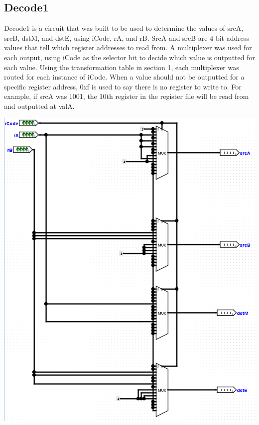 \documentclass{article}
\begin{document}
\subsection{Decode1}
Decode1 is a circuit that was built to be used to determine the values of srcA, srcB, dstM, and dstE, using iCode, rA, and rB. SrcA and srcB are 4-bit address values that tell which register addresses to read from. A multiplexer was used for each output, using iCode as the selector bit to decide which value is outputted for each value. Using the transformation table in section 1, each multiplexer was routed for each instance of iCode. When a value should not be outputted for a specific register address, 0xf is used to say there is no register to write to. For example, if srcA was 1001, the 10th register in the register file will be read from and outputted at valA.
\begin{center}
    \includegraphics[scale=.6, angle = 90]{decode1.png} \\
\end{center}
\end{document}
